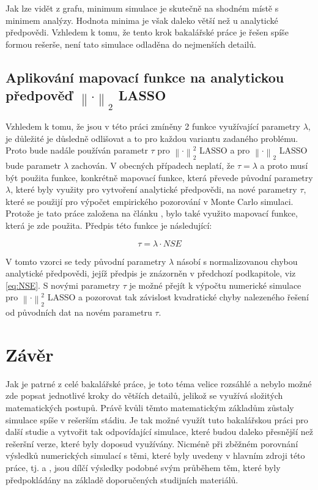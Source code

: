\documentclass[FM,BP]{tulthesis}
\newcounter{Vzorce}
\begin{document}
Jak lze vidět z grafu, minimum simulace je skutečně na shodném místě s minimem analýzy. Hodnota minima je však daleko větší než u analytické předpovědi. Vzhledem k tomu, že tento krok bakalářské práce je řešen spíše formou rešerše, není tato simulace odladěna do nejmenších detailů.

\section{Aplikování mapovací funkce na analytickou předpověď  $\left\| \cdot \right\| _{2}$ LASSO}
\label{subch:mapFunc}
Vzhledem k tomu, že jsou v této práci zmíněny 2 funkce využívající parametry $\lambda$, je důležité je důsledně odlišovat a to pro každou variantu zadaného problému. Proto bude nadále používán parametr $\tau$ pro $\left\| \cdot \right\|_{2}^{2} $ LASSO a pro $\left\| \cdot \right\|_{2} $ LASSO bude parametr $\lambda$ zachován. V obecných případech neplatí, že $\tau = \lambda$ a proto musí být použita funkce, konkrétně mapovací funkce, která převede původní parametry $\lambda$, které byly využity pro vytvoření analytické předpovědi, na nové parametry $\tau$, které se použijí pro výpočet empirického pozorování v Monte Carlo simulaci.
Protože je tato práce založena na článku \cite{hassibiClanek}, bylo také využito mapovací funkce, která je zde použita. Předpis této funkce je následující:

\begin{equation} \label{eq:map}  \tag{Vzorec \theVzorce}
\tau = \lambda \cdot NSE
\end{equation}

V tomto vzorci se tedy původní parametry $\lambda$ násobí s normalizovanou chybou analytické předpovědi, jejíž předpis je znázorněn v předchozí podkapitole, viz \ref{eq:NSE}. S novými parametry $\tau$ je možné přejít k výpočtu numerické simulace pro $\left\| \cdot \right\|_{2}^{2} $ LASSO a pozorovat tak závislost kvadratické chyby nalezeného řešení od původních dat na novém parametru $\tau$.

\chapter{Závěr}
\label{ch:end}
Jak je patrné z celé bakalářské práce, je toto téma velice rozsáhlé a nebylo možné zde popsat jednotlivé kroky do větších detailů, jelikož se využívá složitých matematických postupů. Právě kvůli těmto matematickým základům zůstaly simulace spíše v rešerším stádiu. Je tak možné využít tuto bakalářskou práci pro další studie a vytvořit tak odpovídající simulace, které budou daleko přesnější než rešeršní verze, které byly doposud využívány. Nicméně při zběžném porovnání výsledků numerických simulací s těmi, které byly uvedeny v hlavním zdroji této práce, tj. \cite{hassibiClanek} a \cite{hassibiPrednaska}, jsou dílčí výsledky podobné svým průběhem těm, které byly předpokládány na základě doporučených studijních materiálů.
\end{document}

